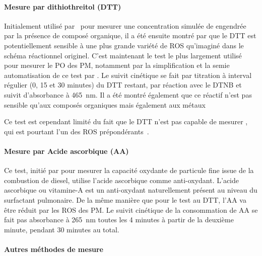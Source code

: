 \paragraph{Mesure par dithiothreitol (DTT)}%
\label{ssub:mesure_par_dithiothreitol}

Initialement utilisé par~\textcite{choRedox2005} pour mesurer une concentration simulée de
 engendrée par la présence de composé organique, il a été ensuite montré par
\textcite{beiReaction2014} que le DTT est potentiellement sensible à une plus grande
variété de ROS qu'imaginé dans le schéma réactionnel originel. C'est maintenant le test le
plus largement utilisé pour mesurer le PO des PM, notamment par la simplification et
la semie automatisation de ce test par \textcite{fangSemiautomated2015}.
Le suivit cinétique se fait par titration à interval régulier (0, 15 et 30 minutes) du DTT
restant, par réaction avec le DTNB et suivit d'absorbance à \SI{465}{nm}.
Il a été montré également que ce réactif n'est pas sensible qu'aux composés organiques
mais également aux métaux~\autocite{charrierDithiothreitol2012,linGeneration2011}

Ce test est cependant limité du fait que le DTT n'est pas capable de mesurer
, qui est pourtant l'un des ROS prépondérants~\autocite{xiongRethinking2017}.

\paragraph{Mesure par Acide ascorbique (AA)}%
\label{ssub:mesure_par_acide_ascorbique}

Ce test, initié par \textcite{zielinskiModeling1999} pour mesurer la capacité oxydante de
particule fine issue de la combustion de diesel, utilise l'acide ascorbique comme
anti-oxydant.
L'acide ascorbique ou vitamine-A est un anti-oxydant naturellement présent au niveau du
surfactant pulmonaire. De la même manière que pour le test au DTT, l'AA va être réduit par
les ROS des PM.
Le suivit cinétique de la consommation de AA se fait pas absorbance à \SI{265}{\nano\m}
toutes les 4 minutes à partir de la deuxième minute, pendant 30 minutes au total.


\paragraph{Autres méthodes de mesure}%
\label{sub:autres_methodes_de_mesure}

